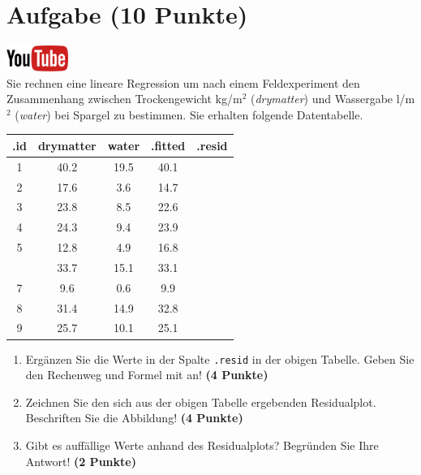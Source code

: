 \documentclass[a4paper, 9pt]{scrartcl}\usepackage[]{graphicx}\usepackage[]{xcolor}
\newenvironment{knitrout}{}{} %
\begin{document}
\section{Aufgabe \hfill (10 Punkte)}

\hfill\href{https://youtu.be/dyQlYV9nOqY}{\includegraphics[width =
  2cm]{img/youtube}}\\[1Ex]

Sie rechnen eine lineare Regression um nach einem Feldexperiment den
Zusammenhang zwischen Trockengewicht kg/m$^2$ (\textit{drymatter}) und
Wassergabe l/m$^2$ (\textit{water}) bei Spargel zu bestimmen. Sie erhalten
folgende Datentabelle.

\begin{knitrout}
\color{fgcolor}\begin{table}[!h]
\centering\begingroup\fontsize{12}{14}\selectfont

\begin{tabular}{ccccc}
\toprule
.id & drymatter & water & .fitted & .resid\\
\midrule
1 & 40.2 & 19.5 & 40.1 & \\
2 & 17.6 & 3.6 & 14.7 & \\
3 & 23.8 & 8.5 & 22.6 & \\
4 & 24.3 & 9.4 & 23.9 & \\
5 & 12.8 & 4.9 & 16.8 & \\
\addlinespace
6 & 33.7 & 15.1 & 33.1 & \\
7 & 9.6 & 0.6 & 9.9 & \\
8 & 31.4 & 14.9 & 32.8 & \\
9 & 25.7 & 10.1 & 25.1 & \\
\bottomrule
\end{tabular}
\endgroup{}
\end{table}

\end{knitrout}

\begin{enumerate}
\item Erg{\"a}nzen Sie die Werte in der Spalte \texttt{.resid} in der obigen
  Tabelle. Geben Sie den Rechenweg und Formel mit an! \textbf{(4 Punkte)}
\item Zeichnen Sie den sich aus der obigen Tabelle ergebenden
  Residualplot. Beschriften Sie die Abbildung! \textbf{(4 Punkte)}
\item Gibt es auff{\"a}llige Werte anhand des Residualplots? Begr{\"u}nden Sie Ihre
  Antwort! \textbf{(2 Punkte)}
\end{enumerate}
 
\end{document}
